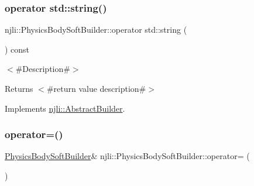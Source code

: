 \subsubsection{\texorpdfstring{operator std\+::string()}{operator std::string()}}
{\footnotesize\ttfamily njli\+::\+Physics\+Body\+Soft\+Builder\+::operator std\+::string (\begin{DoxyParamCaption}{ }\end{DoxyParamCaption}) const\hspace{0.3cm}{\ttfamily [virtual]}}

$<$\#\+Description\#$>$

\begin{DoxyReturn}{Returns}
$<$\#return value description\#$>$ 
\end{DoxyReturn}


Implements \mbox{\hyperlink{classnjli_1_1_abstract_builder_a3e6e553e06d1ca30517ad5fb0bd4d000}{njli\+::\+Abstract\+Builder}}.

\mbox{\label{classnjli_1_1_physics_body_soft_builder_abf6ae90c8e59320950bfc550ed6ade26}} 
\subsubsection{\texorpdfstring{operator=()}{operator=()}}
{\footnotesize\ttfamily \mbox{\hyperlink{classnjli_1_1_physics_body_soft_builder}{Physics\+Body\+Soft\+Builder}}\& njli\+::\+Physics\+Body\+Soft\+Builder\+::operator= (\begin{DoxyParamCaption}\item[{const \mbox{\hyperlink{classnjli_1_1_physics_body_soft_builder}{Physics\+Body\+Soft\+Builder}} \&}]{ }\end{DoxyParamCaption})\hspace{0.3cm}{\ttfamily [protected]}}

\mbox{\label{classnjli_1_1_physics_body_soft_builder_ab419e0da7b86561aec533b94c9b82ca8}} 
